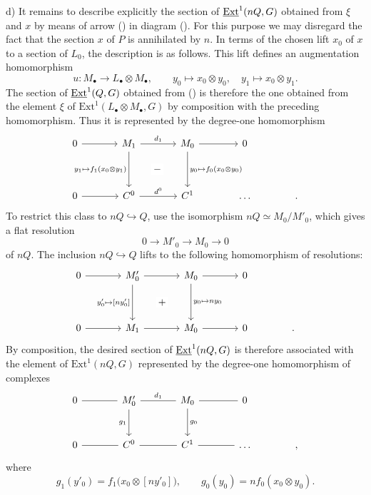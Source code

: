 \medskip
\noindent d) It remains to describe explicitly the section of
$\uExt^1(nQ,G)$ obtained from $\xi$ and $x$ by means of arrow ()
in diagram ().  For this purpose we may disregard the fact that
the section $x$ of $P$ is annihilated by $n$.  In terms of the chosen
lift $x_0$ of $x$ to a section of $L_0$, the description is as follows.
This lift defines an augmentation homomorphism
\[
 u:M_\bullet\longrightarrow L_\bullet\otimes M_\bullet,
 \qquad
 y_0\longmapsto x_0\otimes y_0,
 \quad
 y_1\longmapsto x_0\otimes y_1.
\]
The section of $\uExt^1(Q,G)$ obtained from () is therefore the
one obtained from the element $\xi$ of
$\mathrm{Ext}^1(L_\bullet\otimes M_\bullet,G)$ by composition with
the preceding homomorphism.  Thus it is represented by the
degree-one homomorphism
\[
\begin{tikzcd}[column sep=large,row sep=huge]
 0\arrow[r]&M_1\arrow[r,"d_1"]
   \arrow[d,"{y_1\mapsto f_1(x_0\otimes y_1)}"']
   \arrow[rd,phantom,"-" description]
   &M_0\arrow[r]\arrow[d,"{y_0\mapsto f_0(x_0\otimes y_0)}"]&0\\
 0\arrow[r]&C^0\arrow[r,"d^0"]&C^1&\ldots&{.}
\end{tikzcd}
\]
To restrict this class to $nQ\hookrightarrow Q$, use the isomorphism
$nQ\simeq M_0/M'_0$, which gives a flat resolution
\[
 0\longrightarrow M'_0\longrightarrow M_0\longrightarrow0
\]
of $nQ$.  The inclusion $nQ\hookrightarrow Q$ lifts to the following
homomorphism of resolutions:
\[
\begin{tikzcd}[column sep=large,row sep=huge]
 0\arrow[r]&M'_0\arrow[r]
   \arrow[d,"{y'_0\mapsto[ny'_0]}"']
   \arrow[rd,phantom,"+" description]
   &M_0\arrow[r]\arrow[d,"{y_0\mapsto ny_0}"]&0\\
 0\arrow[r]&M_1\arrow[r]&M_0\arrow[r]&0&{.}
\end{tikzcd}
\]
By composition, the desired section of $\uExt^1(nQ,G)$ is therefore
associated with the element of $\mathrm{Ext}^1(nQ,G)$ represented by
the degree-one homomorphism of complexes
\[
\begin{tikzcd}[column sep=large,row sep=large]
 0\arrow[r,dash]&M'_0\arrow[r,dash,"d_1"]\arrow[d,"g_1"']
   &M_0\arrow[r,dash]\arrow[d,"g_0"]&0&{}\\
 0\arrow[r,dash]&C^0\arrow[r,dash]&C^1\arrow[r,dash]&\dots&{,}
\end{tikzcd}
\]
where
\[
 g_1(y'_0)=f_1\bigl(x_0\otimes[ny'_0]\bigr),
 \qquad
 g_0(y_0)=n f_0(x_0\otimes y_0).
\]

